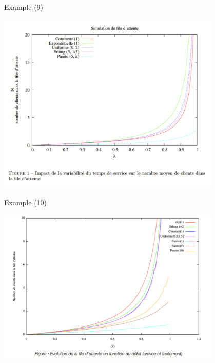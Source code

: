 \documentclass[xcolor=x11names,compress,8pt,fleqn]{beamer}
\renewcommand{\(}{\begin{columns}}
\renewcommand{\)}{\end{columns}}
\newcommand{\<}[1]{\begin{column}{#1}}
\renewcommand{\>}{\end{column}}
\begin{document}
\begin{frame}{Example (9)}
\begin{center}
\includegraphics[width=0.8\textwidth]{Example9}
\end{center}
\end{frame}
\begin{frame}{Example (10)}
\begin{center}
\includegraphics[width=0.8\textwidth]{Example10}
\end{center}
\end{frame}
\end{document}
